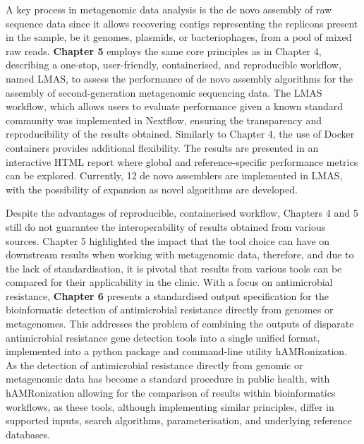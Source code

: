 A key process in metagenomic data analysis is the de novo assembly of raw sequence data since it allows recovering contigs representing the replicons present in the sample, be it genomes, plasmids, or bacteriophages, from a pool of mixed raw reads. \textbf{Chapter 5} employs the same core principles as in Chapter 4, describing a one-stop, user-friendly, containerised, and reproducible workflow, named LMAS, to assess the performance of de novo assembly algorithms for the assembly of second-generation metagenomic sequencing data. The LMAS workflow, which allows users to evaluate performance given a known standard community was implemented in Nextflow, ensuring the transparency and reproducibility of the results obtained. Similarly to Chapter 4, the use of Docker containers provides additional flexibility. The results are presented in an interactive HTML report where global and reference-specific performance metrics can be explored. Currently, 12 de novo assemblers are implemented in LMAS, with the possibility of expansion as novel algorithms are developed. 

Despite the advantages of reproducible, containerised workflow, Chapters 4 and 5 still do not guarantee the interoperability of results obtained from various sources. Chapter 5 highlighted the impact that the tool choice can have on downstream results when working with metagenomic data, therefore, and due to the lack of standardisation, it is pivotal that results from various tools can be compared for their applicability in the clinic. With a focus on antimicrobial resistance, \textbf{Chapter 6} presents a standardised output specification for the bioinformatic detection of antimicrobial resistance directly from genomes or metagenomes. This addresses the problem of combining the outputs of disparate antimicrobial resistance gene detection tools into a single unified format, implemented into a python package and command-line utility hAMRonization. As the detection of antimicrobial resistance directly from genomic or metagenomic data has become a standard procedure in public health, with hAMRonization allowing for the comparison of results within bioinformatics workflows, as these tools, although implementing similar principles, differ in supported inputs, search algorithms, parameterisation, and underlying reference databases. 

